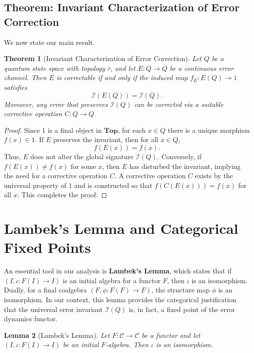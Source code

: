 \documentclass[11pt]{article}
\newtheorem{theorem}{Theorem}[section]
\newtheorem{lemma}[theorem]{Lemma}
\begin{document}
\subsection{Theorem: Invariant Characterization of Error Correction}
We now state our main result.

\begin{theorem}[Invariant Characterization of Error Correction]
\label{thm:invar}
Let \(Q\) be a quantum state space with topology \(\tau\), and let \(E: Q \to Q\) be a continuous error channel. Then \(E\) is correctable if and only if the induced map \(f_E: E(Q) \to 1\) satisfies
\[
\mathcal{I}(E(Q)) = \mathcal{I}(Q).
\]
Moreover, any error that preserves \(\mathcal{I}(Q)\) can be corrected via a suitable corrective operation \(C: Q \to Q\).
\end{theorem}

\begin{proof}
Since \(1\) is a final object in \(\mathbf{Top}\), for each \(x\in Q\) there is a unique morphism \(f(x) \in 1\). If \(E\) preserves the invariant, then for all \(x\in Q\),
\[
f(E(x)) = f(x).
\]
Thus, \(E\) does not alter the global signature \(\mathcal{I}(Q)\). Conversely, if \(f(E(x)) \neq f(x)\) for some \(x\), then \(E\) has disturbed the invariant, implying the need for a corrective operation \(C\). A corrective operation \(C\) exists by the universal property of \(1\) and is constructed so that \(f(C(E(x))) = f(x)\) for all \(x\). This completes the proof.
\end{proof}

\section{Lambek’s Lemma and Categorical Fixed Points}
\label{sec:lambek}
An essential tool in our analysis is \textbf{Lambek’s Lemma}, which states that if \((I,\iota: F(I)\to I)\) is an initial algebra for a functor \(F\), then \(\iota\) is an isomorphism. Dually, for a final coalgebra \((F,\phi: F(F)\to F)\), the structure map \(\phi\) is an isomorphism. In our context, this lemma provides the categorical justification that the universal error invariant \(\mathcal{I}(Q)\) is, in fact, a fixed point of the error dynamics functor.

\begin{lemma}[Lambek's Lemma]
Let \(F: \mathcal{C} \to \mathcal{C}\) be a functor and let \((I,\iota: F(I) \to I)\) be an initial \(F\)-algebra. Then \(\iota\) is an isomorphism.
\end{lemma}
\end{document}
